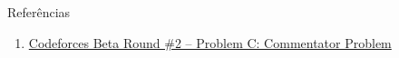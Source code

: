 \begin{frame}[fragile]{Referências}

    \begin{enumerate}
        \item \href{https://codeforces.com/contest/2/problem/C}{Codeforces Beta Round \#2 -- Problem C: Commentator Problem}

    \end{enumerate}

\end{frame}
